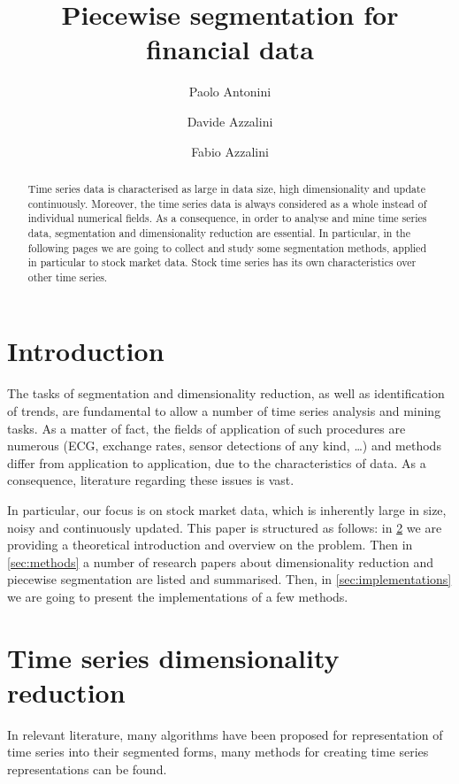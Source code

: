 \documentclass[a4paper]{article}
\title{Piecewise segmentation for financial data}
\author{Paolo Antonini \and Davide Azzalini \and Fabio Azzalini}
\date{}
\begin{document}
\maketitle

\begin{abstract}
Time series data is characterised as large in data size, high dimensionality and update continuously. Moreover, the time series data is always considered as a whole instead of individual numerical fields. As a consequence, in order to analyse and mine time series data, segmentation and dimensionality reduction are essential. In particular, in the following pages we are going to collect and study some segmentation methods, applied in particular to stock market data. Stock time series has its own characteristics over other time series. 
\end{abstract}

\section{Introduction}
The tasks of segmentation and dimensionality reduction, as well as identification of trends, are fundamental to allow a number of time series analysis and mining tasks. As a matter of fact, the fields of application of such procedures are numerous (ECG, exchange rates, sensor detections of any kind, \dots) and methods differ from application to application, due to the characteristics of data. As a consequence, literature regarding these issues is vast. 

In particular, our focus is on stock market data, which is inherently large in size, noisy and continuously updated. This paper is structured as follows: in \cref{sec:theory} we are providing a theoretical introduction and overview on the problem. Then in \cref{sec:methods} a number of research papers about dimensionality reduction and piecewise segmentation are listed and summarised. Then, in \cref{sec:implementations} we are going to present the implementations of a few methods. 


\section{Time series dimensionality reduction}\label{sec:theory}

In relevant literature, many algorithms have been proposed for representation of time series into their segmented forms, many methods for creating time series representations can be found.
\end{document}
